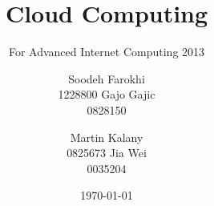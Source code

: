 \documentclass{sig-alternate}
\begin{document}
\title{Cloud Computing}
\subtitle{For Advanced Internet Computing 2013}


\author{
\alignauthor
Soodeh Farokhi\\ %
       1228800
\alignauthor
Gajo Gajic\\
       0828150
\and
\alignauthor
Martin Kalany\\
       0825673
\alignauthor
Jia Wei\\
       0035204
}
       
\date{\today}

\maketitle
\begin{abstract}
\end{abstract}


 
\end{document}

